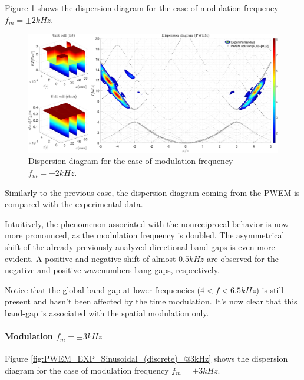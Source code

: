 Figure \ref{fig:PWEM_EXP_Sinusoidal_(discrete)_@2kHz} shows the dispersion diagram for the case of modulation frequency $f_m = \pm 2 kHz$.

\begin{figure}[H]
    \centering
    \includegraphics[width=\textwidth]{img/MATLAB/PWEM_EXP Sinusoidal (discrete) @2kHz.pdf}
    \caption{Dispersion diagram for the case of modulation frequency $f_m = \pm 2 kHz$.}
    \label{fig:PWEM_EXP_Sinusoidal_(discrete)_@2kHz}
\end{figure}

Similarly to the previous case, the dispersion diagram coming from the PWEM is compared with the experimental data.

Intuitively, the phenomenon associated with the nonreciprocal behavior is now more pronounced, as the modulation frequency is doubled.
The asymmetrical shift of the already previously analyzed directional band-gaps is even more evident.
A positive and negative shift of almost $0.5kHz$ are observed for the negative and positive wavenumbers bang-gaps, respectively.

Notice that the global band-gap at lower frequencies ($4 < f < 6.5 kHz$) is still present and hasn't been affected by the time modulation.
It's now clear that this band-gap is associated with the spatial modulation only.



\paragraph{Modulation $f_m = \pm 3 kHz$}

Figure \ref{fig:PWEM_EXP_Sinusoidal_(discrete)_@3kHz} shows the dispersion diagram for the case of modulation frequency $f_m = \pm 3 kHz$.

